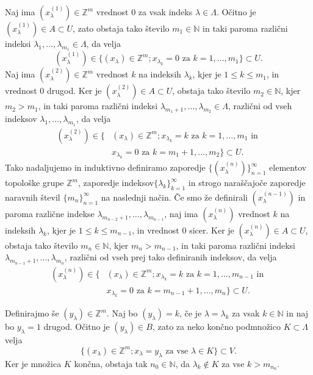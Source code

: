 \documentclass[mat1]{fmfdelo}
\newcommand{\N}{\mathbb N}
\newcommand{\Z}{\mathbb Z}
\begin{document}
\begin{dokaz}
Naj ima $(x_\lambda^{(1)}) \in \Z^m$ vrednost $0$ za vsak indeks $\lambda \in \Lambda$. Očitno je $(x_\lambda^{(1)}) \in A \subset U$, zato obstaja tako število $m_1 \in \N$ in taki paroma različni indeksi $\lambda_1,\dots, \lambda_{m_1} \in \Lambda$, da velja
\[ (x_\lambda^{(1)}) \in \lbrace (x_\lambda) \in \Z^m ; x_{\lambda_k} = 0 \text{ za } k=1,\dots,m_1\rbrace \subset U. \]
Naj ima $(x_\lambda^{(2)}) \in \Z^m$ vrednost $k$ na indeksih $\lambda_k$, kjer je $1 \leq k \leq m_1$, in vrednost $0$ drugod. Ker je $(x_\lambda^{(2)}) \in A \subset U$, obstaja tako število $m_2 \in \N$, kjer $m_2 > m_1$, in taki paroma različni indeksi $\lambda_{m_1+1},\dots,\lambda_{m_2} \in \Lambda$, različni od vseh indeksov $\lambda_1,\dots, \lambda_{m_1}$, da velja
\begin{align*}
(x_\lambda^{(2)}) \in \lbrace &(x_\lambda) \in \Z^m ; x_{\lambda_k} = k \text{ za } k=1,\dots,m_1 \text{ in }\\
& x_{\lambda_k} = 0 \text{ za } k = m_1+1,\dots, m_2\rbrace \subset U.
\end{align*}
Tako nadaljujemo in induktivno definiramo zaporedje $\lbrace (x_\lambda^{(n)}) \rbrace_{n = 1}^\infty$ elementov topološke grupe $\Z^m$, zaporedje indeksov$\lbrace\lambda_k\rbrace_{k = 1}^\infty$ in strogo naraščajoče zaporedje naravnih števil $\lbrace m_n \rbrace_{n = 1}^\infty$ na naslednji način. Če smo že definirali $(x_\lambda^{(n-1)})$ in paroma različne indekse $\lambda_{m_{n-2}+1},\dots, \lambda_{m_{n-1}}$, naj ima $(x_\lambda^{(n)})$ vrednost $k$ na indeksih $\lambda_k$, kjer je $1 \leq k \leq m_{n-1}$, in vrednost $0$ sicer. Ker je $(x_\lambda^{(n)}) \in A \subset U$, obstaja tako število $m_n \in \N$, kjer $m_n > m_{n-1}$, in taki paroma različni indeksi $\lambda_{m_{n-1}+1},\dots,\lambda_{m_n}$, različni od vseh prej tako definiranih indeksov, da velja
\begin{align*}
(x_\lambda^{(n)}) \in \lbrace &(x_\lambda) \in \Z^m ; x_{\lambda_k} = k \text{ za } k=1,\dots,m_{n-1} \text{ in }\\
& x_{\lambda_k} = 0 \text{ za } k = m_{n-1}+1,\dots, m_n\rbrace \subset U.
\end{align*}

Definirajmo še $(y_\lambda) \in \Z^m$. Naj bo $(y_\lambda) = k$, če je $\lambda = \lambda_k$ za vsak $k \in \N$ in naj bo $y_\lambda = 1$ drugod. Očitno je $(y_\lambda) \in B$, zato za neko končno podmnožico $K \subset \Lambda$ velja
\[ \lbrace (x_\lambda) \in \Z^m ; x_\lambda = y_\lambda \text{ za vse } \lambda \in K \rbrace \subset V. \]
Ker je množica $K$ končna, obstaja tak $n_0 \in \N$, da $\lambda_k \notin K$ za vse $k > m_{n_0}$.


\end{dokaz}
\end{document}
